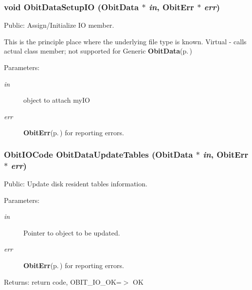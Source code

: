 \subsubsection{\setlength{\rightskip}{0pt plus 5cm}void Obit\-Data\-Setup\-IO ({\bf Obit\-Data} $\ast$ {\em in}, {\bf Obit\-Err} $\ast$ {\em err})}\label{ObitData_8h_a37}


Public: Assign/Initialize IO member. 

This is the principle place where the underlying file type is known. Virtual - calls actual class member; not supported for Generic {\bf Obit\-Data}{\rm (p.\,\pageref{structObitData})} \begin{Desc}
\item[Parameters:]
\begin{description}
\item[{\em in}]object to attach my\-IO \item[{\em err}]{\bf Obit\-Err}{\rm (p.\,\pageref{structObitErr})} for reporting errors. \end{description}
\end{Desc}
\subsubsection{\setlength{\rightskip}{0pt plus 5cm}Obit\-IOCode Obit\-Data\-Update\-Tables ({\bf Obit\-Data} $\ast$ {\em in}, {\bf Obit\-Err} $\ast$ {\em err})}\label{ObitData_8h_a45}


Public: Update disk resident tables information. 

\begin{Desc}
\item[Parameters:]
\begin{description}
\item[{\em in}]Pointer to object to be updated. \item[{\em err}]{\bf Obit\-Err}{\rm (p.\,\pageref{structObitErr})} for reporting errors. \end{description}
\end{Desc}
\begin{Desc}
\item[Returns:]return code, OBIT\_\-IO\_\-OK=$>$ OK \end{Desc}
